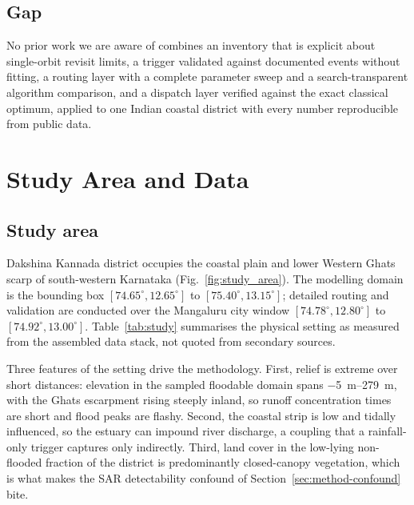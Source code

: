 \documentclass[10pt,twocolumn]{article}
\begin{document}
\subsection{Gap}
No prior work we are aware of combines an inventory that is explicit about
single-orbit revisit limits, a trigger validated against documented events
without fitting, a routing layer with a complete parameter sweep and a
search-transparent algorithm comparison, and a dispatch layer verified against
the exact classical optimum, applied to one Indian coastal district with every
number reproducible from public data.

\section{Study Area and Data}
\label{sec:study}

\subsection{Study area}
Dakshina Kannada district occupies the coastal plain and lower Western Ghats
scarp of south-western Karnataka (Fig.~\ref{fig:study_area}). The modelling
domain is the bounding box $[74.65^\circ, 12.65^\circ]$ to
$[75.40^\circ, 13.15^\circ]$; detailed routing and validation are conducted over
the Mangaluru city window $[74.78^\circ, 12.80^\circ]$ to
$[74.92^\circ, 13.00^\circ]$. Table~\ref{tab:study} summarises the physical
setting as measured from the assembled data stack, not quoted from
secondary sources.

Three features of the setting drive the methodology. First, relief is extreme
over short distances: elevation in the sampled floodable domain spans
\SIrange{-5}{279}{\metre}, with the Ghats escarpment rising steeply inland, so
runoff concentration times are short and flood peaks are flashy. Second, the
coastal strip is low and tidally influenced, so the estuary can impound river
discharge, a coupling that a rainfall-only trigger captures only indirectly.
Third, land cover in the low-lying non-flooded fraction of the district is
predominantly closed-canopy vegetation, which is what makes the SAR detectability
confound of Section~\ref{sec:method-confound} bite.
\end{document}
